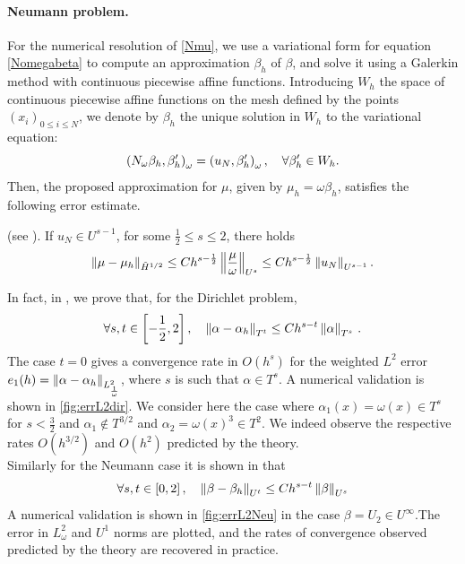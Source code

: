 \documentclass[a4paper]{subfiles}
\begin{document}
\paragraph{Neumann problem.} For the numerical resolution of \eqref{Nmu}, we use a variational form for equation \eqref{Nomegabeta} to compute an approximation $\beta_h$ of $\beta$, and solve 
it using a Galerkin method with continuous piecewise affine functions. Introducing $W_h$ the space of continuous piecewise affine functions on the mesh
defined by the points $(x_i)_{0\leq i\leq N}$, we denote by $\beta_h$ the unique solution in $W_h$ to the variational equation:
\begin{equation}
\left( N_\omega \beta_h,\beta_h'\right)_{\omega} = \left( u_N,\beta_h'\right)_{\omega}, \quad \forall \beta_h' \in W_h.
\label{NomegaBetaGalerk}
\end{equation}
Then, the proposed approximation for $\mu$, given by $\mu_h = \omega \beta_h$, satisfies the following error estimate. 
\begin{theorem}(see \cite{averseng}).
	If $u_N \in U^{s-1}$, for some $\frac{1}{2} \leq s \leq 2$, there holds 
	\[\left\|\mu - \mu_h\right\|_{\tilde{H}^{1/2}} \leq C h^{s - \frac{1}{2}}\left\|\frac{\mu}{\omega}\right\|_{U^{s}}\leq C h^{s - \frac{1}{2}}\left\|u_N\right\|_{U^{s-1}}.\]
	\label{theOrdreCVNeumann}
\end{theorem}
In fact, in \cite{averseng}, we prove that, for the Dirichlet problem,
\[\forall s,t \in \left[-\frac{1}{2},2\right], \quad \left\|\alpha - \alpha_h\right\|_{T^t} \leq C h^{s - t}\left\|\alpha\right\|_{T^s}\,.\] 
The case $t = 0$ gives a convergence rate in $O(h^s)$ for the weighted $L^2 $ error $e_1(h) = \left\|\alpha - \alpha_h\right\|_{L^2_\frac{1}{\omega}}$, where $s$ is such that $\alpha \in T^s$. A numerical validation is shown in \autoref{fig:errL2dir}. We consider here the case where $\alpha_1(x) = \omega(x) \in T^{s}$ for $s < \frac{3}{2}$ and $\alpha_1 \notin T^{3/2}$ and $\alpha_2 = \omega(x)^3 \in T^2$. We indeed observe the respective rates $O(h^{3/2})$ and $O(h^2)$ predicted by the theory. \\
Similarly for the Neumann case it is shown in \cite{averseng} that
\begin{equation}
\forall s,t \in\left[0, 2\right], \quad \left\|\beta - \beta_h\right\|_{U^t} \leq Ch^{s - t}\left\|\beta\right\|_{U^s}
\label{estimUsUt}
\end{equation} 
A numerical validation is shown in \autoref{fig:errL2Neu} in the case $\beta = U_2 \in U^{\infty}$.The error in $L^2_\omega$ and $U^1$ norms are plotted, and the rates of convergence observed predicted by the theory are recovered in practice. 
\end{document}
